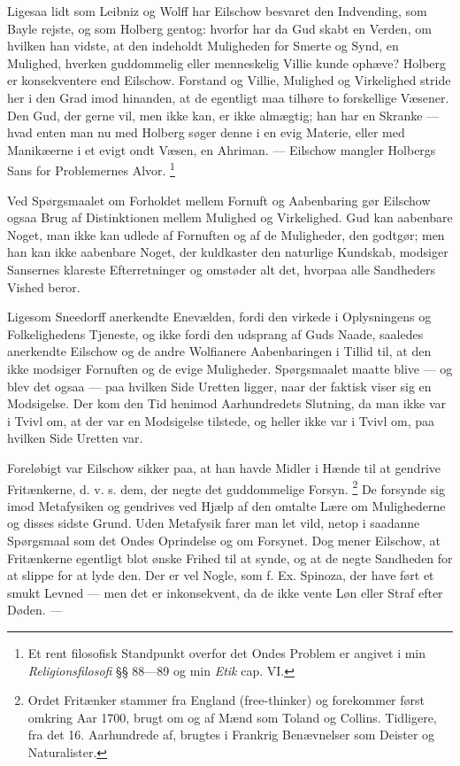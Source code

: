 \documentclass[12pt,a4paper,openany]{book}
\newcommand{\opage}[1]{\marginnote{\footnotesize\textit{[#1]}}}
\begin{document}
Ligesaa lidt som Leibniz og Wolff har Eilschow besvaret den Indvending, som
Bayle rejste, og som Holberg gentog: hvorfor har da Gud skabt en Verden, om
hvilken han vidste, at den indeholdt Muligheden for Smerte og Synd, en
Mulighed, hverken guddommelig eller menneskelig Villie kunde ophæve? Holberg er
konsekventere end Eilschow. Forstand og Villie, Mulighed og Virkelighed stride
her i den Grad imod hinanden, at de egentligt maa tilhøre to forskellige
Væsener. Den Gud, der gerne vil, men ikke kan, er ikke almægtig; han har en
Skranke --- hvad enten man nu med Holberg søger denne i en evig Materie, eller
med Manikæerne i et evigt ondt Væsen, en Ahriman. --- Eilschow mangler Holbergs
Sans for Problemernes Alvor.%
\footnote[2]{Et rent filosofisk Standpunkt overfor det Ondes Problem er angivet
i min \textit{Religionsfilosofi} §§ 88---89 og min \textit{Etik} cap. VI.}

\setcounter{footnote}{0}%
\opage{23}Ved Spørgsmaalet om Forholdet mellem Fornuft og Aabenbaring gør
Eilschow ogsaa Brug af Distinktionen mellem Mulighed og Virkelighed. Gud kan
aabenbare Noget, man ikke kan udlede af Fornuften og af de Muligheder, den
godtgør; men han kan ikke aabenbare Noget, der kuldkaster den naturlige
Kundskab, modsiger Sansernes klareste Efterretninger og omstøder alt det,
hvorpaa alle Sandheders Vished beror.

Ligesom Sneedorff anerkendte Enevælden, fordi den virkede i Oplysningens og
Folkelighedens Tjeneste, og ikke fordi den udsprang af Guds Naade, saaledes
anerkendte Eilschow og de andre Wolfianere Aabenbaringen i Tillid til, at den
ikke modsiger Fornuften og de evige Muligheder. Spørgsmaalet maatte blive ---
og blev det ogsaa --- paa hvilken Side Uretten ligger, naar der faktisk viser
sig en Modsigelse. Der kom den Tid henimod Aarhundredets Slutning, da man ikke
var i Tvivl om, at der var en Modsigelse tilstede, og heller ikke var i Tvivl
om, paa hvilken Side Uretten var.

Foreløbigt var Eilschow sikker paa, at han havde Midler i Hænde til at gendrive
Fritænkerne, d. v. s. dem, der negte det guddommelige Forsyn.%
\footnote[1]{Ordet Fritænker stammer fra England (free-thinker) og forekommer
først omkring Aar 1700, brugt om og af Mænd som Toland og Collins. Tidligere,
fra det 16. Aarhundrede af, brugtes i Frankrig Benævnelser som Deister og
Naturalister.} De forsynde sig imod Metafysiken og gendrives ved Hjælp af den
omtalte Lære om Mulighederne og disses sidste Grund. Uden Metafysik farer man
let vild, netop i saadanne Spørgsmaal som det Ondes Oprindelse og om Forsynet.
Dog mener Eilschow, at Fritænkerne egentligt blot ønske Frihed til at synde, og
at de negte Sandheden for at slippe for at lyde den. Der er vel Nogle, som f.
Ex. Spinoza, der have ført et smukt Levned --- men det er inkonsekvent, da de
ikke vente Løn eller Straf efter Døden. ---
\end{document}
